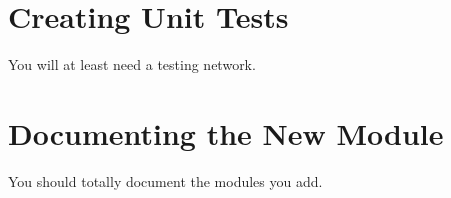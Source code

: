 \documentclass[fleqn,11pt,openany]{book}
\begin{document}

\chapter{Creating Unit Tests}
\label{sec:unit_tests}

\begin{introduction}
\end{introduction}

You will at least need a testing network.  



\chapter{Documenting the New Module}
\label{sec:Documenting}

\begin{introduction}
\end{introduction}

You should totally document the modules you add.  

\end{document}
